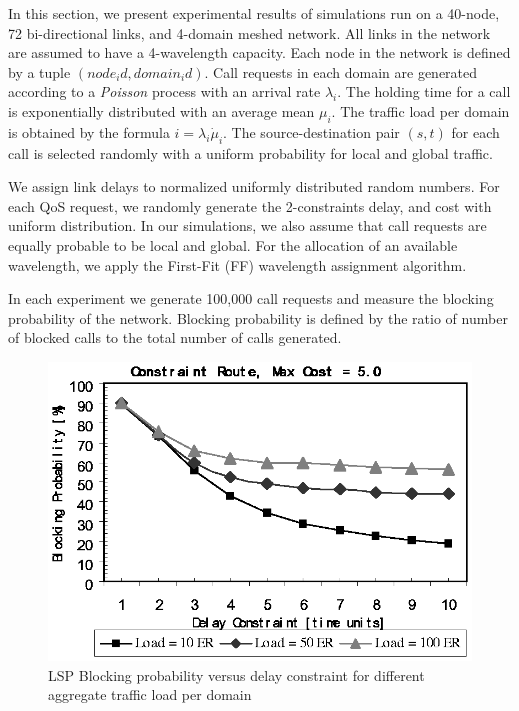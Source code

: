In this section, we present experimental results of simulations run on a 40-node, 72 bi-directional links, and 4-domain meshed network. All links in the network are assumed to have a 4-wavelength capacity. 
Each node in the network is defined by a tuple $(node_id, domain_id)$. Call requests in each domain are generated according to a \emph{Poisson} process with an arrival rate $\lambda_i$. The holding time for a call is exponentially distributed with an average mean $\mu_i$. The traffic load per domain is obtained by the formula $i =\lambda_i \dot \mu_i$. The source-destination pair $(s, t)$ for each call is selected randomly with a uniform probability for local and global traffic.

We assign link delays to normalized uniformly distributed random numbers. For each QoS request, we randomly generate the 2-constraints delay,  and cost with uniform distribution. In our simulations, we also assume that call requests are equally probable to be local and global. For the allocation of an available wavelength, we apply the First-Fit (FF) wavelength assignment algorithm.

In each experiment we generate 100,000 call requests and measure the blocking probability of the network. Blocking probability is defined by the ratio of number of blocked calls to the total number of calls generated.

\begin{figure}[t]
\centering
\includegraphics{Figures/InterdomainWDM.eps}
\caption[LSP blocking probability]
{LSP Blocking probability versus delay constraint for different aggregate traffic load per domain}
\label{fig:InterdomainWDM}
\end{figure}

